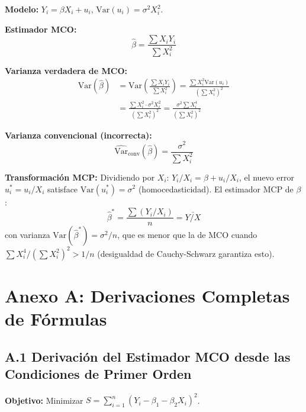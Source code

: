 \documentclass[12pt,a4paper]{report}
\theoremstyle{definition}
\theoremstyle{remark}
\newcommand{\Var}{\mathrm{Var}}
\newcommand{\betahat}{\hat{\beta}}
\begin{document}
\begin{tcolorbox}[ejerciciostyle, title={Ejercicio 11.10: Modelo sin intercepto con $\Var(u_i) = \sigma^2 X_i^2$}]
  \textbf{Modelo:} $Y_i = \beta X_i + u_i$, $\Var(u_i) = \sigma^2 X_i^2$.

  \textbf{Estimador MCO:}
  \begin{equation*}
    \betahat = \frac{\sum X_i Y_i}{\sum X_i^2}
  \end{equation*}

  \textbf{Varianza verdadera de MCO:}
  \begin{align*}
    \Var(\betahat) &= \Var\left(\frac{\sum X_i Y_i}{\sum X_i^2}\right) = \frac{\sum X_i^2 \Var(u_i)}{\left(\sum X_i^2\right)^2}\\
    &= \frac{\sum X_i^2 \cdot \sigma^2 X_i^2}{\left(\sum X_i^2\right)^2} = \frac{\sigma^2 \sum X_i^4}{\left(\sum X_i^2\right)^2}
  \end{align*}

  \textbf{Varianza convencional (incorrecta):}
  \begin{equation*}
    \widehat{\Var}_{\text{conv}}(\betahat) = \frac{\sigma^2}{\sum X_i^2}
  \end{equation*}

  \textbf{Transformación MCP:} Dividiendo por $X_i$: $Y_i/X_i = \beta + u_i/X_i$, el nuevo error $u_i^* = u_i/X_i$ satisface $\Var(u_i^*) = \sigma^2$ (homocedasticidad). El estimador MCP de $\beta$:
  \begin{equation*}
    \betahat^* = \frac{\sum (Y_i/X_i)}{n} = \bar{Y/X}
  \end{equation*}
  con varianza $\Var(\betahat^*) = \sigma^2/n$, que es menor que la de MCO cuando $\sum X_i^4/(\sum X_i^2)^2 > 1/n$ (desigualdad de Cauchy-Schwarz garantiza esto).
\end{tcolorbox}

\chapter*{Anexo A: Derivaciones Completas de Fórmulas}

\section*{A.1 Derivación del Estimador MCO desde las Condiciones de Primer Orden}

\textbf{Objetivo:} Minimizar $S = \sum_{i=1}^n (Y_i - \beta_1 - \beta_2 X_i)^2$.
\end{document}
